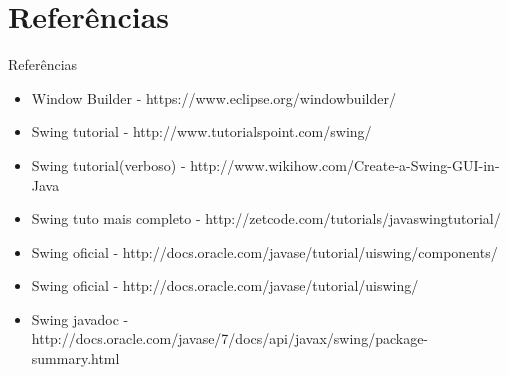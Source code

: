 \documentclass[10pt]{beamer}
\begin{document}
\section{Referências}
\begin{frame}{Referências}{}
\begin{itemize}
\item Window Builder - https://www.eclipse.org/windowbuilder/
\item Swing tutorial - http://www.tutorialspoint.com/swing/
\item Swing tutorial(verboso) - http://www.wikihow.com/Create-a-Swing-GUI-in-Java
\item Swing tuto mais completo - http://zetcode.com/tutorials/javaswingtutorial/
\item Swing oficial - http://docs.oracle.com/javase/tutorial/uiswing/components/
\item Swing oficial - http://docs.oracle.com/javase/tutorial/uiswing/
\item Swing javadoc - http://docs.oracle.com/javase/7/docs/api/javax/swing/package-summary.html
\end{itemize}
\end{frame}
\end{document}
